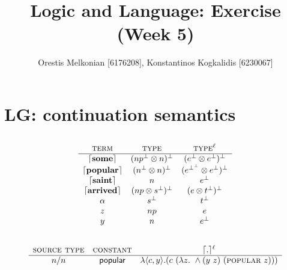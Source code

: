 \documentclass[]{article}
\title{\textbf{Logic and Language: Exercise (Week 5)}}
\author{Orestis Melkonian [6176208], Konstantinos Kogkalidis [6230067]}
\date{}
\newcommand{\tsc}{\textsc}
\newcommand{\ceil}[1]{\lceil #1 \rceil}
\newcommand{\w}[1]{\ceil{\mathbf{#1}}}
\begin{document}
\maketitle
\section{LG: continuation semantics}
\subsection{}
\[\begin{array}{ccc}
\tsc{term} & \tsc{type} & \tsc{type}^\ell\\
\hline
\w{some} & (np^\bot \otimes n)^\bot & (e^\bot \otimes e^\bot)^\bot \\
\w{popular} & (n^\bot \otimes n)^\bot & (e^{\bot^\bot} \otimes e^\bot)^\bot \\
\w{saint} & n & e^\bot \\
\w{arrived} & (np \otimes s^\bot)^\bot & (e \otimes t^\bot)^\bot \\
\alpha & s^\bot & t^\bot \\
z & np & e \\
y & n & e^\bot \\
\end{array}\]
\subsection{}
\[\begin{array}{ccc}
\textsc{source type} & \textsc{constant} & \ceil{.}^\ell\\
\hline 
n/n & \textsf{popular} & \lambda\langle c,y \rangle. (c\ (\lambda z.\ \wedge (y\ z)\ (\tsc{popular}\ z)))\\
\end{array}\]
\end{document}
